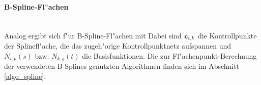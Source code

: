 \paragraph{B-Spline-Fl"achen}~\\
Analog ergibt sich f"ur B-Spline-Fl"achen mit 
Dabei sind ${\bf c}_{i,k}$ die Kontrollpunkte der Splinefl"ache, die das 
zugeh"orige Kontrollpunktnetz aufspannen und $N_{i,p}(s)$ bzw. $N_{k,q}(t)$ 
die Basisfunktionen. Die zur Fl"achenpunkt-Berechnung der verwendeten 
B-Splines genutzten Algorithmen finden sich im Abschnitt \ref{algo_spline}.

